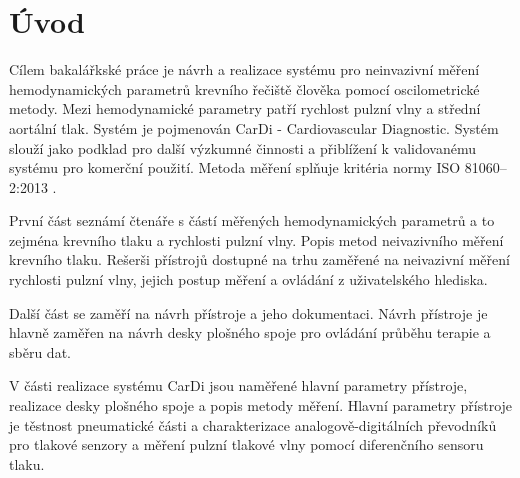 \documentclass{ctuthesis}
\begin{document}
\maketitle



\chapter{Úvod}
Cílem bakalářkské práce je návrh a realizace systému pro neinvazivní měření hemodynamických parametrů krevního řečiště člověka pomocí oscilometrické metody. Mezi hemodynamické parametry patří rychlost pulzní vlny a střední aortální tlak.
Systém je pojmenován CarDi - Cardiovascular Diagnostic. Systém slouží jako podklad pro další výzkumné činnosti a přiblížení k validovanému systému pro komerční použití. Metoda měření splňuje kritéria normy ISO 81060–2:2013 \cite{cite:Validation}.

\par
První část seznámí čtenáře s částí měřených hemodynamických parametrů a to zejména krevního tlaku a rychlosti pulzní vlny. Popis metod neivazivního měření krevního tlaku. Rešerši přístrojů dostupné na trhu zaměřené na neivazivní měření rychlosti pulzní vlny, jejich postup měření a ovládání z uživatelského hlediska.
\par
Další část se zaměří na návrh přístroje a jeho dokumentaci. Návrh přístroje je hlavně zaměřen na návrh desky plošného spoje pro ovládání průběhu terapie a sběru dat.
\par
V části realizace systému CarDi jsou naměřené hlavní parametry přístroje, realizace desky plošného spoje a popis metody měření. Hlavní parametry přístroje je těstnost pneumatické části a charakterizace analogově-digitálních převodníků pro tlakové senzory a měření pulzní tlakové vlny pomocí diferenčního sensoru tlaku.








\end{document}
